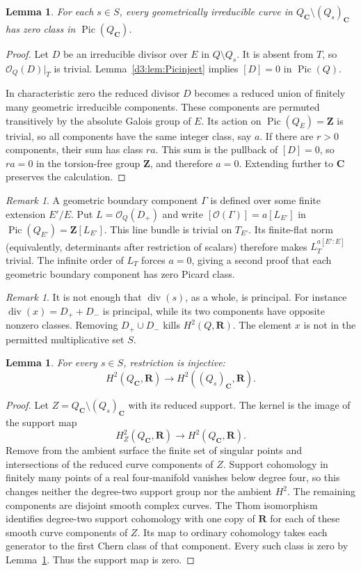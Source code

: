 \documentclass[11pt,a4paper]{amsart}
\numberwithin{equation}{section}
\newtheorem{lemma}[theorem]{Lemma}
\theoremstyle{definition}
\theoremstyle{remark}
\newtheorem{remark}[theorem]{Remark}
\newcommand{\Z}{\mathbf Z}
\newcommand{\R}{\mathbf R}
\newcommand{\C}{\mathbf C}
\newcommand{\OO}{\mathcal O}
\newcommand{\Pic}{\operatorname{Pic}}
\newcommand{\divisor}{\operatorname{div}}
\begin{document}
\begin{lemma}\label{d3:lem:components}
For each $s\in S$, every geometrically irreducible curve in $Q_{\C}\setminus(Q_s)_{\C}$ has zero class in $\Pic(Q_{\C})$.
\end{lemma}
\begin{proof}
Let $D$ be an irreducible divisor over $E$ in $Q\setminus Q_s$. It is absent from $T$, so $\OO_Q(D)|_T$ is trivial. Lemma~\ref{d3:lem:Picinject} implies $[D]=0$ in $\Pic(Q)$.

In characteristic zero the reduced divisor $D$ becomes a reduced union of finitely many geometric irreducible components. These components are permuted transitively by the absolute Galois group of $E$. Its action on $\Pic(Q_{\overline E})=\Z$ is trivial, so all components have the same integer class, say $a$. If there are $r>0$ components, their sum has class $ra$. This sum is the pullback of $[D]=0$, so $ra=0$ in the torsion-free group $\Z$, and therefore $a=0$. Extending further to $\C$ preserves the calculation.
\end{proof}

\begin{remark}
A geometric boundary component $\Gamma$ is defined over some finite
extension $E'/E$. Put $L=\OO_Q(D_+)$ and write
$[\OO(\Gamma)]=a[L_{E'}]$ in $\Pic(Q_{E'})=\Z[L_{E'}]$.
This line bundle is trivial on $T_{E'}$. Its finite-flat norm
(equivalently, determinants after restriction of scalars) therefore
makes $L_T^{a[E':E]}$ trivial. The infinite order of $L_T$ forces
$a=0$, giving a second proof that each geometric boundary component has zero Picard class.
\end{remark}

\begin{remark}
It is not enough that $\divisor(s)$, as a whole, is principal. For instance $\divisor(x)=D_++D_-$ is principal, while its two components have opposite nonzero classes. Removing $D_+\cup D_-$ kills $H^2(Q,\R)$. The element $x$ is not in the permitted multiplicative set $S$.
\end{remark}

\begin{lemma}\label{d3:lem:Betti}
For every $s\in S$, restriction is injective:
\[
H^2(Q_{\C},\R)\longrightarrow H^2((Q_s)_{\C},\R).
\]
\end{lemma}
\begin{proof}
Let $Z=Q_{\C}\setminus(Q_s)_{\C}$ with its reduced support. The kernel is the image of the support map
\[
H_Z^2(Q_{\C},\R)\longrightarrow H^2(Q_{\C},\R).
\]
Remove from the ambient surface the finite set of singular points and intersections of the reduced curve components of $Z$. Support cohomology in finitely many points of a real four-manifold vanishes below degree four, so this changes neither the degree-two support group nor the ambient $H^2$. The remaining components are disjoint smooth complex curves. The Thom isomorphism identifies degree-two support cohomology with one copy of $\R$ for each of these smooth curve components of $Z$. Its map to ordinary cohomology takes each generator to the first Chern class of that component. Every such class is zero by Lemma~\ref{d3:lem:components}. Thus the support map is zero.
\end{proof}
\end{document}
